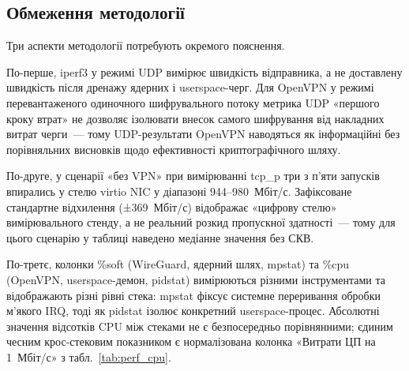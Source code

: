 \subsection*{Обмеження методології}
\label{subsec:perf_caveats}

Три аспекти методології потребують окремого пояснення.

По-перше, iperf3 у режимі UDP вимірює швидкість відправника, а не доставлену
швидкість після дренажу ядерних і userspace-черг. Для OpenVPN у режимі
перевантаженого одиночного шифрувального потоку метрика UDP «першого кроку
втрат» не дозволяє ізолювати внесок самого шифрування від накладних витрат
черги~--- тому UDP-результати OpenVPN наводяться як інформаційні без
порівняльних висновків щодо ефективності криптографічного шляху.

По-друге, у сценарії «без VPN» при вимірюванні tcp\_p три з п'яти запусків
впирались у стелю virtio NIC у діапазоні 944--980~Мбіт/с. Зафіксоване
стандартне відхилення (±369~Мбіт/с) відображає «цифрову стелю» вимірювального
стенду, а не реальний розкид пропускної здатності~--- тому для цього сценарію
у таблиці наведено медіанне значення без СКВ.

По-третє, колонки \%soft (WireGuard, ядерний шлях, mpstat) та \%cpu (OpenVPN,
userspace-демон, pidstat) вимірюються різними інструментами та
відображають різні рівні стека: mpstat фіксує системне переривання обробки
м'якого IRQ, тоді як pidstat ізолює конкретний userspace-процес. Абсолютні
значення відсотків CPU між стеками не є безпосередньо порівнянними; єдиним
чесним крос-стековим показником є нормалізована колонка «Витрати ЦП на
1~Мбіт/с» з табл.~\ref{tab:perf_cpu}.

